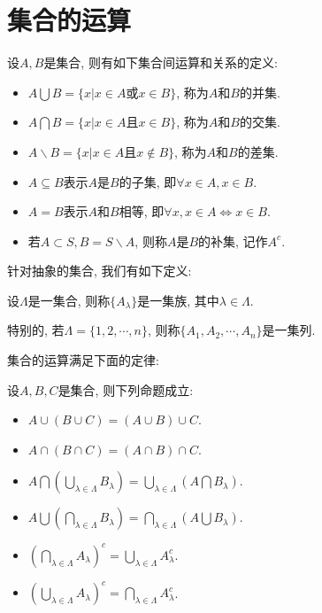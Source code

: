 \documentclass[theorem=false,mathfont=none,openany,sub3section]{easybook}
\begin{document}
\section{集合的运算}

\begin{definition}
  设$A,B$是集合, 则有如下集合间运算和关系的定义:\par
  \begin{itemize}
    \item
      $A\bigcup B=\{x|x\in A\text{或}x\in B\}$, 称为$A$和$B$的并集.
    \item
      $A\bigcap B=\{x|x\in A\text{且}x\in B\}$, 称为$A$和$B$的交集.
    \item
      $A\backslash B=\{x|x\in A\text{且}x\notin B\}$, 称为$A$和$B$的差集.
    \item
      $A\subseteq B$表示$A$是$B$的子集, 即$\forall x\in A, x\in B$.
    \item
      $A=B$表示$A$和$B$相等, 即$\forall x, x\in A\Leftrightarrow x\in B$.
    \item 
      若$A\subset S, B=S\backslash A$, 则称$A$是$B$的补集, 记作$A^{c}$.
  \end{itemize}

\end{definition}
针对抽象的集合, 我们有如下定义:\par
\begin{definition}
  设$\varLambda $是一集合, 则称$\{A_{\lambda}\}$是一集族, 其中$\lambda\in\varLambda$.\par
  特别的, 若$\varLambda=\{1,2,\cdots,n\}$, 则称$\{A_{1},A_{2},\cdots,A_{n}\}$是一集列.\par
\end{definition}

集合的运算满足下面的定律:\par
\begin{theorem}
  设$A,B,C$是集合, 则下列命题成立:\par
  \begin{itemize}
    \item $A\cup (B\cup C)=(A\cup B)\cup C$.
    \item $A\cap (B\cap C)=(A\cap B)\cap C$.
    \item $A\bigcap (\bigcup_{\lambda \in \varLambda}B_{\lambda})=\bigcup_{\lambda \in \varLambda}(A\bigcap B_{\lambda})$.
    \item $A\bigcup (\bigcap_{\lambda \in \varLambda}B_{\lambda})=\bigcap_{\lambda \in \varLambda}(A\bigcup B_{\lambda})$.
    \item $(\bigcap_{\lambda \in \varLambda}A_{\lambda})^{c}=\bigcup_{\lambda \in \varLambda}A_{\lambda}^{c}$.
    \item $(\bigcup_{\lambda \in \varLambda}A_{\lambda})^{c}=\bigcap_{\lambda \in \varLambda}A_{\lambda}^{c}$.
  \end{itemize}
\end{theorem}
\end{document}
